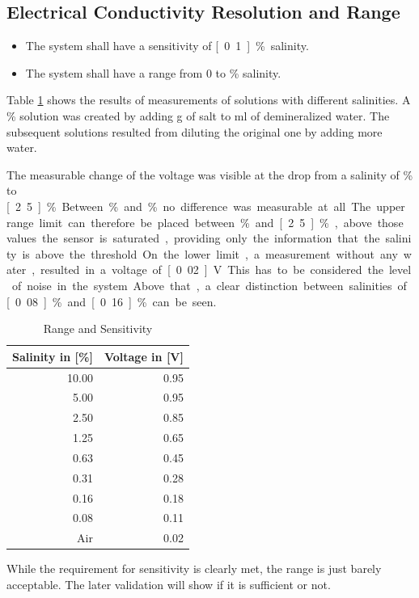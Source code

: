 \subsection{Electrical Conductivity Resolution and Range}


\begin{itemize}
\item The system shall have a sensitivity of  \unit[0.1]{\%} salinity.
\item The system shall have a range from 0 to \unit[5]{\%} salinity.
\end{itemize}

Table \ref{tab:rns} shows the results of measurements of solutions with different salinities. A \unit[10]{\%} solution was created by adding \unit[5]{g} of salt to \unit[100]{ml} of demineralized water. The subsequent solutions resulted from diluting the original one by adding more water.

The measurable change of the voltage was visible at the drop from a salinity of \unit[5]{\%} to \unit[2.5]{\%}. Between \unit[10]{\%} and \unit[5]{\%} no difference was measurable at all. The upper range limit can therefore be placed between \unit[5]{\%} and \unit[2.5]{\%}, above those values the sensor is saturated, providing only the information that the salinity is above the threshold.

On the lower limit, a measurement without any water, resulted in a voltage of \unit[0.02]{V}. This has to be considered the level of noise in the system. Above that, a clear distinction between salinities of \unit[0.08]{\%} and \unit[0.16]{\%} can be seen.

\begin{table}[H]
    \centering

    \caption[cal]{Range and Sensitivity}
    \label{tab:rns}
    \begin{tabular}{rr}
        	\toprule
        	Salinity in [\%] & Voltage in [V] \tabularnewline
        	\midrule
		10.00 & 0.95 \tabularnewline
        	5.00 & 0.95 \tabularnewline
		2.50 & 0.85 \tabularnewline
		1.25 & 0.65 \tabularnewline
		0.63 & 0.45 \tabularnewline
		0.31 & 0.28 \tabularnewline
		0.16 & 0.18 \tabularnewline
		0.08 & 0.11 \tabularnewline
		Air & 0.02 \tabularnewline
        \bottomrule
    \end{tabular}
\end{table}

While the requirement for sensitivity is clearly met, the range is just barely acceptable. The later validation will show if it is sufficient or not.

